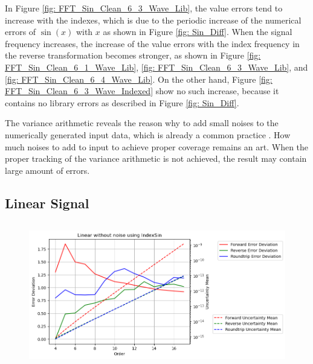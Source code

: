 \documentclass[twoside]{article}
\numberwithin{equation}{section}
\begin{document}
In Figure \ref{fig: FFT_Sin_Clean_6_3_Wave_Lib}, the value errors tend to increase with the indexes, which is due to the periodic increase of the numerical errors of $\sin(x)$ with $x$ as shown in Figure \ref{fig: Sin_Diff}.
When the signal frequency increases, the increase of the value errors with the index frequency in the reverse transformation becomes stronger, as shown in Figure \ref{fig: FFT_Sin_Clean_6_1_Wave_Lib}, \ref{fig: FFT_Sin_Clean_6_3_Wave_Lib}, and \ref{fig: FFT_Sin_Clean_6_4_Wave_Lib}.
On the other hand, Figure \ref{fig: FFT_Sin_Clean_6_3_Wave_Indexed} show no such increase, because it contains no library errors as described in Figure \ref{fig: Sin_Diff}.

The variance arithmetic reveals the reason why to add small noises to the numerically generated input data, which is already a common practice \cite{Numerical_Recipes}.
How much noises to add to input to achieve proper coverage remains an art.
When the proper tracking of the variance arithmetic is not achieved, the result may contain large amount of errors.


\subsection{Linear Signal}

\begin{figure}[p]
\centering
\includegraphics[height=2.5in]{FFT_Linear_Clean_vs_Order_Indexed.png} 
\label{fig: FFT_SinCos_Linear_vs_Order_Indexed}
\end{figure}
\end{document}
